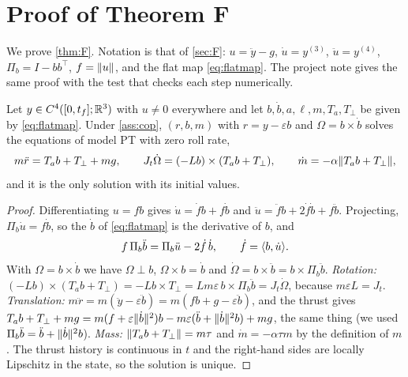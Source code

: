 \section{Proof of Theorem F}\label{app:F}
We prove \cref{thm:F}. Notation is that of \cref{sec:F}: $u=\ddot y-g$, $\dot u=y^{(3)}$, $\ddot u=y^{(4)}$, $\Pi_b=I-bb^\top$,
$f=\lVert u\rVert$, and the flat map \eqref{eq:flatmap}. The project note  gives the same proof with the test that checks each step numerically.

\begin{lemma}\label{lem:F-flat}
Let $y\in C^4([0,t_f];\mathbb{R}^3)$ with $u\ne0$ everywhere and let $b,\dot b,a,\ell,m,T_a,T_\perp$ be given by \eqref{eq:flatmap}. Under
\cref{ass:cop}, $(r,b,m)$ with $r=y-\varepsilon b$ and $\Omega=b\times\dot b$ solves the equations of model PT with zero roll rate,
\[
m\ddot r=T_ab+T_\perp+mg,\qquad J_t\dot\Omega=(-Lb)\times(T_ab+T_\perp),\qquad \dot m=-\alpha\lVert T_ab+T_\perp\rVert,
\]
and it is the only solution with its initial values.
\end{lemma}
\begin{proof}
Differentiating $u=fb$ gives $\dot u=\dot fb+f\dot b$ and $\ddot u=\ddot fb+2\dot f\dot b+f\ddot b$. Projecting, $\Pi_b\dot u=f\dot b$, so
the $\dot b$ of \eqref{eq:flatmap} is the derivative of $b$, and
\begin{equation}\label{eq:Pbdd}
f\,\Pi_b\ddot b=\Pi_b\ddot u-2\dot f\,\dot b,\qquad \dot f=\langle b,\dot u\rangle.
\end{equation}
With $\Omega=b\times\dot b$ we have $\Omega\perp b$, $\Omega\times b=\dot b$ and $\dot\Omega=b\times\ddot b=b\times\Pi_b\ddot b$.
\emph{Rotation:} $(-Lb)\times(T_ab+T_\perp)=-Lb\times T_\perp=Lm\varepsilon\,b\times\Pi_b\ddot b=J_t\dot\Omega$, because
$m\varepsilon L=J_t$. \emph{Translation:} $m\ddot r=m(\ddot y-\varepsilon\ddot b)=m(fb+g-\varepsilon\ddot b)$, and the thrust gives
$T_ab+T_\perp+mg=m(f+\varepsilon\lVert \dot b\rVert^2)b-m\varepsilon(\ddot b+\lVert \dot b\rVert^2b)+mg$, the same thing (we used
$\Pi_b\ddot b=\ddot b+\lVert \dot b\rVert^2b$). \emph{Mass:} $\lVert T_ab+T_\perp\rVert=m\tau$ and $\dot m=-\alpha\tau m$ by the definition of $m$.
The thrust history is continuous in $t$ and the right-hand sides are locally Lipschitz in the state, so the solution is unique.
\end{proof}

